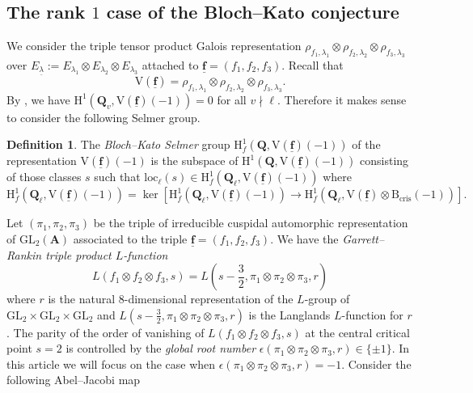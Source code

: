 \documentclass[10pt]{amsart}
\numberwithin{equation}{section}
\theoremstyle{plain}
\numberwithin{equation}{section}
\theoremstyle{definition}
\newtheorem{definition}[theorem]{Definition}
\theoremstyle{remark}
\def\GL{\mathrm{GL}}
\def\loc{\mathrm{loc}}
\def\undlamb{\underline{\lambda}}
\def\triplef{\underline{\mathbf{f}}}
\def\Adel{\mathbf{A}}
\def\QQ{\mathbf{Q}}
\def\rmH{\mathrm{H}}
\def\rmV{\mathrm{V}}
\begin{document}
\subsection{The rank $1$ case of the Bloch--Kato conjecture} 
We consider the triple tensor product Galois representation $\rho_{f_{1}, \lambda_{1}}\otimes\rho_{f_{2}, \lambda_{2}}\otimes\rho_{f_{3}, \lambda_{3}}$ over $E_{\undlamb}:=E_{\lambda_{1}}\otimes E_{\lambda_{2}}\otimes E_{\lambda_{3}}$ attached to $\triplef=(f_{1}, f_{2}, f_{3})$. Recall that
\begin{equation*}
\mathrm{V}(\triplef)=\rho_{f_{1}, \lambda_{1}}\otimes\rho_{f_{2}, \lambda_{2}}\otimes\rho_{f_{3}, \lambda_{3}}.
\end{equation*}
By \cite[Lemma 5.1]{Wang}, we have $\rmH^{1}(\QQ_{v}, \rmV(\triplef)(-1))=0$ for all $v\nmid \ell$. Therefore it makes sense to consider the following Selmer group.
\begin{definition}\label{BK-def}
The \emph{Bloch--Kato Selmer} group $\rmH^{1}_{f}(\QQ, \mathrm{V}(\triplef)(-1))$ of the representation  $\mathrm{V}(\triplef)(-1)$ is the subspace of $\rmH^{1}(\QQ, \mathrm{V}(\triplef)(-1))$ consisting of those classes $s$ such that $\loc_{\ell}(s)\in \rmH^{1}_{f}(\QQ_{\ell}, \mathrm{V}(\triplef)(-1))$ where 
\begin{equation*}
\rmH^{1}_{f}(\QQ_{\ell}, \mathrm{V}(\triplef)(-1))= \ker[\rmH^{1}_{f}(\QQ_{\ell}, \mathrm{V}(\triplef)(-1))\rightarrow \rmH^{1}_{f}(\QQ_{\ell}, \mathrm{V}(\triplef)\otimes \mathrm{B}_{\mathrm{cris}}(-1))].
\end{equation*}
\end{definition}
Let $(\pi_{1}, \pi_{2}, \pi_{3})$ be the triple of irreducible cuspidal automorphic representation of $\GL_{2}(\Adel)$ associated to the triple $\triplef=(f_{1}, f_{2},f_{3})$. We have the \emph{Garrett--Rankin triple  product $L$-function}
\begin{equation*}
L(f_{1}\otimes f_{2}\otimes f_{3}, s)=L(s-\frac{3}{2}, \pi_{1}\otimes\pi_{2}\otimes \pi_{3}, r)
\end{equation*}
where $r$ is the natural $8$-dimensional representation of the $L$-group of $\GL_{2}\times \GL_{2}\times \GL_{2}$ and $L(s-\frac{3}{2}, \pi_{1}\otimes\pi_{2}\otimes \pi_{3}, r)$ is the Langlands $L$-function for $r$. The parity of the order of vanishing of $L(f_{1}\otimes f_{2}\otimes f_{3}, s)$ at the central critical point $s={2}$ is controlled by the \emph{global root number} $\epsilon(\pi_{1}\otimes\pi_{2}\otimes\pi_{3}, r)\in\{\pm1\}$.  In this article we will focus on the case when $\epsilon(\pi_{1}\otimes\pi_{2}\otimes\pi_{3}, r)=-1$. Consider the following Abel--Jacobi map 
\end{document}
